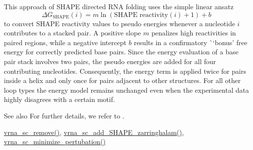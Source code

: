 This approach of S\+H\+A\+PE directed R\+NA folding uses the simple linear ansatz \[ \Delta G_{\text{SHAPE}}(i) = m \ln(\text{SHAPE reactivity}(i)+1)+ b \] to convert S\+H\+A\+PE reactivity values to pseudo energies whenever a nucleotide $ i $ contributes to a stacked pair. A positive slope $ m $ penalizes high reactivities in paired regions, while a negative intercept $ b $ results in a confirmatory \`{}`bonus'\textquotesingle{} free energy for correctly predicted base pairs. Since the energy evaluation of a base pair stack involves two pairs, the pseudo energies are added for all four contributing nucleotides. Consequently, the energy term is applied twice for pairs inside a helix and only once for pairs adjacent to other structures. For all other loop types the energy model remains unchanged even when the experimental data highly disagrees with a certain motif.

\begin{DoxySeeAlso}{See also}
For further details, we refer to \cite{deigan:2009}. 

\mbox{\hyperlink{group__soft__constraints_ga73cdc07b9a199c614367bebef0f2c41a}{vrna\+\_\+sc\+\_\+remove()}}, \mbox{\hyperlink{group__SHAPE__reactivities_gaf3c65a045060aef5c4e41693d30af58c}{vrna\+\_\+sc\+\_\+add\+\_\+\+S\+H\+A\+P\+E\+\_\+zarringhalam()}}, \mbox{\hyperlink{group__perturbation_gaa124bdc20d88001c38ade590c4bcc3c4}{vrna\+\_\+sc\+\_\+minimize\+\_\+pertubation()}}
\end{DoxySeeAlso}

